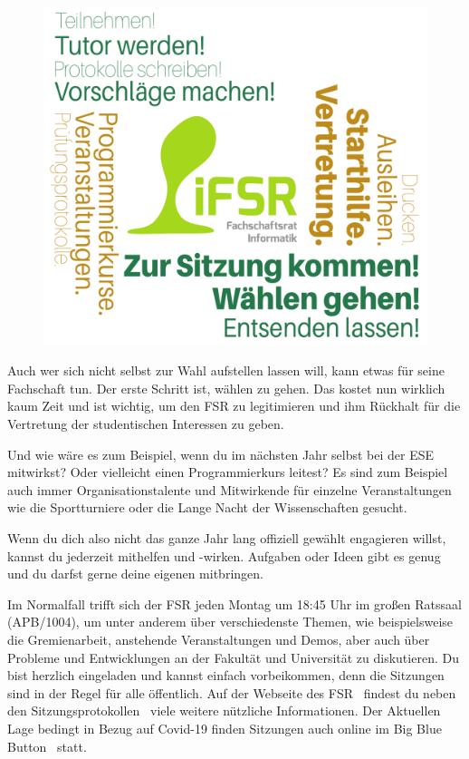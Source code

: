 \begin{figure}[b!]
    \centering
    \includegraphics[width=\linewidth]{img/f1_neu}
\end{figure}

Auch wer sich nicht selbst zur Wahl aufstellen lassen will, kann etwas für seine Fachschaft tun.
Der erste Schritt ist, wählen zu gehen. Das kostet nun wirklich kaum Zeit und ist wichtig, um den FSR zu legitimieren und ihm Rückhalt für die Vertretung der studentischen Interessen zu geben.

Und wie wäre es zum Beispiel, wenn du im nächsten Jahr selbst bei der ESE mitwirkst? Oder vielleicht einen Programmierkurs leitest?
Es sind zum Beispiel auch immer Organisationstalente und Mitwirkende für einzelne Veranstaltungen wie die Sportturniere oder die Lange Nacht der Wissenschaften gesucht.

Wenn du dich also nicht das ganze Jahr lang offiziell gewählt engagieren willst, kannst du jederzeit mithelfen und -wirken. Aufgaben oder Ideen gibt es genug und du darfst gerne deine eigenen mitbringen.

Im Normalfall trifft sich der FSR jeden Montag um 18:45 Uhr im großen Ratssaal (APB/1004), um unter anderem über verschiedenste Themen, wie beispielsweise die Gremienarbeit, anstehende Veranstaltungen und Demos, aber auch über Probleme und Entwicklungen an der Fakultät und Universität zu diskutieren.
Du bist herzlich eingeladen und kannst einfach vorbeikommen, denn die Sitzungen sind in der Regel für alle öffentlich. Auf der Webseite des FSR~ findest du neben den Sitzungsprotokollen~ viele weitere nützliche Informationen.
Der Aktuellen Lage bedingt in Bezug auf Covid-19 finden Sitzungen auch online im Big Blue Button~ statt.

